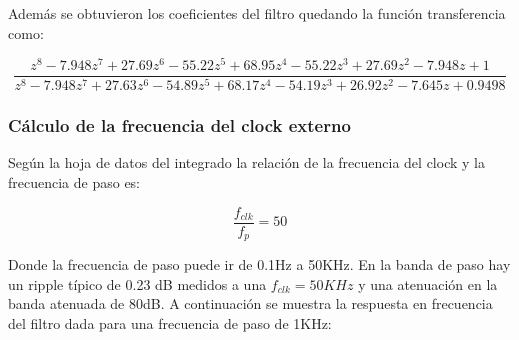 \documentclass[assd_tp3_main.tex]{subfiles}
\begin{document}
Además se obtuvieron  los coeficientes del filtro quedando la función transferencia como:

$$\frac{z^8 - 7.948 z^7 + 27.69 z^6  - 55.22 z^5 + 68.95 z^4 - 55.22 z^3 + 27.69 z^2 - 7.948 z + 1}{z^8 - 7.948 z^7+27.63 z^6 - 54.89 z^5 + 68.17 z^4 - 54.19 z^3 + 26.92 z^2 - 7.645 z+ 0.9498}
$$


\subsubsection{Cálculo de la frecuencia del clock externo}

Según la hoja de datos del integrado la relación de la frecuencia del clock y la frecuencia de paso es: 

\begin{equation}
	\frac{f_{clk}}{f_p} = 50
	\label{eq:fpfclk}
\end{equation} 

Donde la frecuencia de paso puede ir de 0.1Hz a 50KHz. En la banda de paso hay un
ripple típico de 0.23 dB medidos a una $f_{clk}=50KHz$ y una atenuación en la banda
atenuada de 80dB. A continuación se muestra la respuesta en frecuencia del filtro dada
para una frecuencia de paso de 1KHz: 
\end{document}
